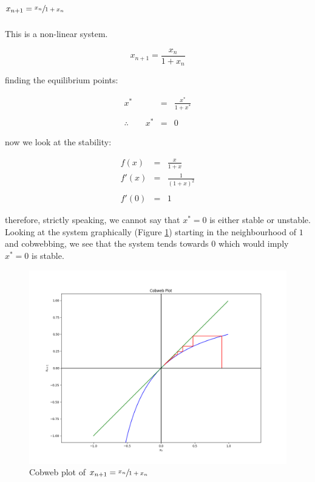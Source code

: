 \documentclass{report}
\begin{document}
\section{$x_{n + 1} = \sfrac{x_n}{1 + x_n}$}

This is a non-linear system. \bigskip

\[
    x_{n + 1} = \frac{x_n}{1 + x_n}
\]\medskip

finding the equilibrium points: \bigskip

\begin{eqnarray*}
                      x^* & = & \frac{x^*}{1 + x^*} \\\\
    \therefore \qquad x^* & = & 0
\end{eqnarray*}\medskip

now we look at the stability: \bigskip

\begin{eqnarray*}
    f(x) & = & \frac{x}{1 + x} \\
   f'(x) & = & \frac{1}{(1 + x)^2} \\\\
   f'(0) & = & 1
\end{eqnarray*}\medskip

therefore, strictly speaking, we cannot say that $x^* = 0$ is either stable or unstable.
Looking at the system graphically (Figure \ref{fig:cobweb_02}) starting in the
neighbourhood of $1$ and cobwebbing,  we see that the system tends towards $0$ which
would imply $x^* = 0$ is stable. \bigskip

\begin{figure}[h]
	\centering
	\includegraphics[scale = 0.4]{cobweb_02}
	\caption{Cobweb plot of $x_{n + 1} = \sfrac{x_n}{1 + x_n}$}
	\label{fig:cobweb_02}
\end{figure}\medskip
\end{document}
